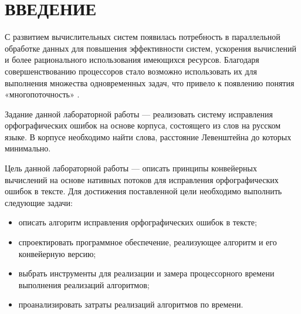 \chapter*{ВВЕДЕНИЕ}

С развитием вычислительных систем появилась потребность в параллельной обработке данных для повышения эффективности систем, ускорения вычислений и более рационального использования имеющихся ресурсов. 
Благодаря совершенствованию процессоров стало возможно использовать их для выполнения множества одновременных задач, что привело к появлению понятия «многопоточность» \cite{intro}.

Задание данной лабораторной работы --- реализовать систему исправления орфографических ошибок на основе корпуса, состоящего из слов на русском языке.
В корпусе необходимо найти слова, расстояние Левенштейна до которых минимально.

Цель данной лабораторной работы --- описать принципы конвейерных вычислений на основе нативных потоков для исправления орфографических ошибок в тексте. Для достижения поставленной цели необходимо выполнить следующие задачи:
\begin{itemize}
	\item описать алгоритм исправления орфографических ошибок в тексте;
	\item спроектировать программное обеспечение, реализующее алгоритм и его конвейерную версию;
	\item выбрать инструменты для реализации и замера процессорного времени
	выполнения реализаций алгоритмов;
	\item проанализировать затраты реализаций алгоритмов по времени.
\end{itemize}